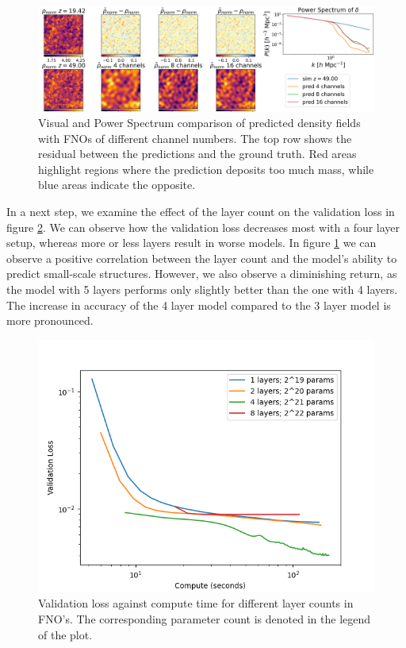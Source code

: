 \documentclass{article}
\begin{document}
\begin{figure}[t]
    \centering
    \includegraphics[width=0.95\linewidth]{img/compare_channels.png}
    \caption{Visual and Power Spectrum comparison of predicted density fields with FNOs of different channel numbers. The top row shows the residual between the predictions and the ground truth. Red areas highlight regions where the prediction deposits too much mass, while blue areas indicate the opposite.}
    \label{fig:channels-A}
\end{figure}


In a next step, we examine the effect of the layer count on the validation loss in figure \ref{fig:layer-B}. We can observe how the validation loss decreases most with a four layer setup, whereas more or less layers result in worse models. In figure \ref{fig:channels-A} we can observe a positive correlation between the layer count and the model's ability to predict small-scale structures. However, we also observe a diminishing return, as the model with 5 layers performs only slightly better than the one with 4 layers. The increase in accuracy of the 4 layer model compared to the 3 layer model is more pronounced. 

\begin{figure}[h]
    \centering
    \includegraphics[width=0.4\linewidth]{img/layer_compute.png}
    \caption{Validation loss against compute time for different layer counts in FNO's. The corresponding parameter count is denoted in the legend of the plot.}
    \label{fig:layer-B}
\end{figure}
\end{document}
